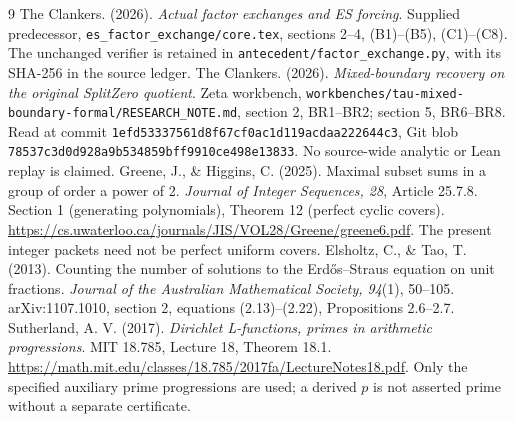 \begin{thebibliography}{9}
 The Clankers. (2026). \emph{Actual factor exchanges and ES forcing}.
Supplied predecessor, \texttt{es\_factor\_exchange/core.tex}, sections 2--4,
(B1)--(B5), (C1)--(C8). The unchanged verifier is retained in
\texttt{antecedent/factor\_exchange.py}, with its SHA-256 in the source ledger.
 The Clankers. (2026). \emph{Mixed-boundary recovery on the original
SplitZero quotient}. Zeta workbench,
\texttt{workbenches/tau-mixed-boundary-formal/RESEARCH\_NOTE.md},
section 2, BR1--BR2; section 5, BR6--BR8.
Read at commit \texttt{1efd53337561d8f67cf0ac1d119acdaa222644c3},
Git blob \texttt{78537c3d0d928a9b534859bff9910ce498e13833}.
No source-wide analytic or Lean replay is claimed.
 Greene, J., \& Higgins, C. (2025). Maximal subset sums in a group
of order a power of 2. \emph{Journal of Integer Sequences, 28}, Article 25.7.8.
Section 1 (generating polynomials), Theorem 12 (perfect cyclic covers).
\url{https://cs.uwaterloo.ca/journals/JIS/VOL28/Greene/greene6.pdf}.
The present integer packets need not be perfect uniform covers.
 Elsholtz, C., \& Tao, T. (2013). Counting the number of solutions
to the Erd\H{o}s--Straus equation on unit fractions.
\emph{Journal of the Australian Mathematical Society, 94}(1), 50--105.
arXiv:1107.1010, section 2, equations (2.13)--(2.22), Propositions 2.6--2.7.
 Sutherland, A. V. (2017). \emph{Dirichlet L-functions,
primes in arithmetic progressions}. MIT 18.785, Lecture 18, Theorem 18.1.
\url{https://math.mit.edu/classes/18.785/2017fa/LectureNotes18.pdf}.
Only the specified auxiliary prime progressions are used; a derived $p$
is not asserted prime without a separate certificate.
\end{thebibliography}

